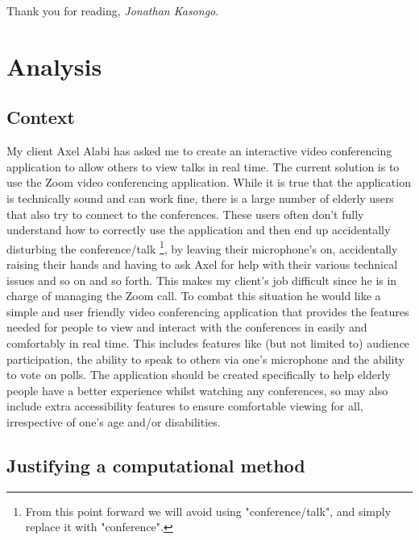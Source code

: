 Thank you for reading, \textit{Jonathan Kasongo}.

\chapter{Analysis}

\section{Context}
\label{sec:context}

My client Axel Alabi has asked me to create an interactive
video conferencing application to allow others to view talks
in real time. The current solution is to use the Zoom
video conferencing application. While it is true that the
application is technically sound and can work fine, there is a
large number of elderly users that also try to connect to the
conferences. These users often don't fully understand how to
correctly use the application and then end up accidentally
disturbing the conference/talk \footnote{From this point
forward we will avoid using "conference/talk", and simply
replace it with "conference".}, by leaving their microphone's
on, accidentally raising their hands and having to ask Axel
for help with their various technical issues and so on and so
forth. This makes my client's job difficult since he is in
charge of managing the Zoom call. To combat this situation
he would like a simple and user friendly video conferencing
application that provides the features needed for people to
view and interact with the conferences in easily and
comfortably in real time. This includes
features like (but not limited to) audience participation,
the ability to speak to others via one's microphone and the
ability to vote on polls. The application should be
created specifically to help elderly people have a better
experience whilst watching any conferences, so may also
include extra accessibility features to ensure comfortable
viewing for all, irrespective of one's age and/or disabilities.

\section{Justifying a computational method}
\label{sec:computational}

